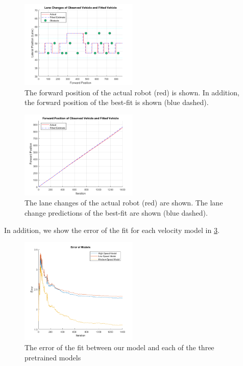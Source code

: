 \documentclass[conference]{IEEEtran}
\begin{document}
\begin{figure}[ht]
    \includegraphics[width=0.5\textwidth]{fit2.png}
    \caption{The forward position of the actual robot (red) is shown. In addition, the forward position of the best-fit is shown (blue dashed).}
    \label{fig:cs1}
\end{figure}

\begin{figure}[ht]
    \includegraphics[width=0.5\textwidth]{fit1.png}
    \caption{The lane changes of the actual robot (red) are shown. The lane change predictions of the best-fit are shown (blue dashed).}
    \label{fig:cs1b}
\end{figure}
 In addition, we show the error of the fit for each velocity model in \ref{fig:cs1c}.
 
 \begin{figure}[ht]
    \includegraphics[width=0.5\textwidth]{fit3.png}
    \caption{The error of the fit between our model and each of the three pretrained models}
    \label{fig:cs1c}
\end{figure}
\end{document}
